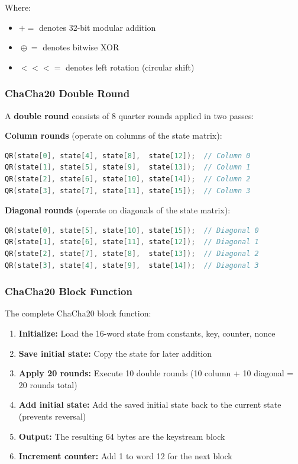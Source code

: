 \documentclass[11pt,a4paper]{article}
\begin{document}
Where:
\begin{itemize}[noitemsep]
    \item $\mathrel{+}=$ denotes 32-bit modular addition
    \item $\mathrel{\oplus}=$ denotes bitwise XOR
    \item $\mathrel{<<<}=$ denotes left rotation (circular shift)
\end{itemize}

\subsubsection{ChaCha20 Double Round}

A \textbf{double round} consists of 8 quarter rounds applied in two passes:

\textbf{Column rounds} (operate on columns of the state matrix):
\begin{lstlisting}[language=C]
QR(state[0], state[4], state[8],  state[12]);  // Column 0
QR(state[1], state[5], state[9],  state[13]);  // Column 1
QR(state[2], state[6], state[10], state[14]);  // Column 2
QR(state[3], state[7], state[11], state[15]);  // Column 3
\end{lstlisting}

\textbf{Diagonal rounds} (operate on diagonals of the state matrix):
\begin{lstlisting}[language=C]
QR(state[0], state[5], state[10], state[15]);  // Diagonal 0
QR(state[1], state[6], state[11], state[12]);  // Diagonal 1
QR(state[2], state[7], state[8],  state[13]);  // Diagonal 2
QR(state[3], state[4], state[9],  state[14]);  // Diagonal 3
\end{lstlisting}

\subsubsection{ChaCha20 Block Function}

The complete ChaCha20 block function:

\begin{enumerate}[noitemsep]
    \item \textbf{Initialize:} Load the 16-word state from constants, key, counter, nonce
    \item \textbf{Save initial state:} Copy the state for later addition
    \item \textbf{Apply 20 rounds:} Execute 10 double rounds (10 column + 10 diagonal = 20 rounds total)
    \item \textbf{Add initial state:} Add the saved initial state back to the current state (prevents reversal)
    \item \textbf{Output:} The resulting 64 bytes are the keystream block
    \item \textbf{Increment counter:} Add 1 to word 12 for the next block
\end{enumerate}
\end{document}
